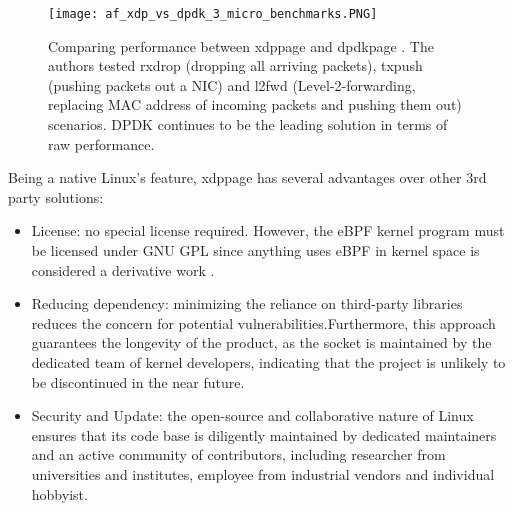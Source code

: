 \begin{figure}[H]
	\centering
	\texttt{[image: af\_xdp\_vs\_dpdk\_3\_micro\_benchmarks.PNG]}
	\caption{Comparing performance between \ac{xdppage} and \ac{dpdkpage} \cite{karlsson_path_to_dpdk_speednodate}. The authors tested  rxdrop (dropping all arriving packets), txpush (pushing packets out a NIC) and l2fwd (Level-2-forwarding, replacing MAC address of incoming packets and pushing them out) scenarios. DPDK continues to be the leading solution in terms of raw performance.}\label{fig:sota:af_xdp_vs_dpdk_3_micro_benchmarks}
\end{figure}

Being a native Linux's feature, \ac{xdppage} has several advantages over other 3rd party solutions:
\begin{itemize}
	\item License: no special license required. However, the eBPF kernel program must be licensed under GNU \ac{GPL} since anything uses eBPF in kernel space is considered a derivative work \cite{gpl_email_discussion} \cite{linux_license_rule} \cite{lwn_clarify_bpf_license}.
	\item Reducing dependency: minimizing the reliance on third-party libraries reduces the concern for potential vulnerabilities.Furthermore, this approach guarantees the longevity of the product, as the socket is maintained by the dedicated team of kernel developers, indicating that the project is unlikely to be discontinued in the near future. 
	\item Security and Update: the open-source and collaborative nature of Linux ensures that its code base is diligently maintained by dedicated maintainers and an active community of contributors, including researcher from universities and institutes, employee from industrial vendors and individual hobbyist.
\end{itemize}



